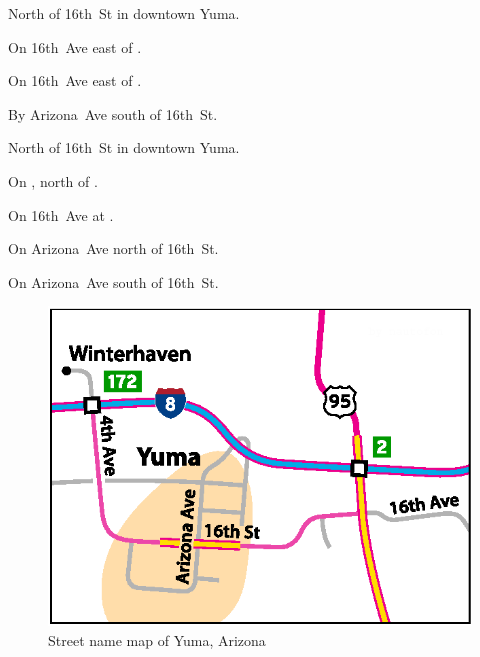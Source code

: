 
\begin{LocationList}

North of 16th~St in downtown Yuma.

\Location{\GarageHQ \Garage}
On 16th~Ave east of .

On 16th~Ave east of .

By Arizona~Ave south of 16th~St.

North of 16th~St in downtown Yuma.

On , north of  .

\Location{\TruckStop \Gas \Rest \Weigh}
On 16th~Ave at .

On Arizona~Ave north of 16th~St.

On Arizona~Ave south of 16th~St.

\end{LocationList}

\begin{figure}[hp]
\includegraphics[scale=0.77]{cities/arizona/yuma}
\centering\caption{Street name map of Yuma, Arizona}
\end{figure}
